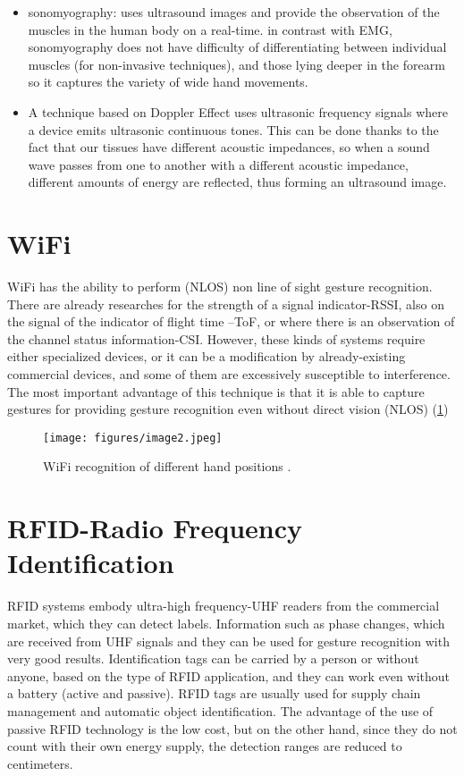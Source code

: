 \documentclass[12pt]{book}
\begin{document}
\begin{itemize}
    \item sonomyography: uses ultrasound images and provide the observation of the muscles in the human body on a real-time. in contrast with EMG, sonomyography does not have difficulty of differentiating between individual muscles (for non-invasive techniques), and those lying deeper in the forearm so it captures the variety of wide hand movements.
    \item A technique based on Doppler Effect uses ultrasonic frequency signals where a device emits ultrasonic continuous tones. This can be done thanks to the fact that our tissues have different acoustic impedances, so when a sound wave passes from one to another with a different acoustic impedance, different amounts of energy are reflected, thus forming an ultrasound image. 
\end{itemize}

\section{WiFi}\label{s:sec7}
WiFi has the ability to perform (NLOS) non line of sight gesture recognition. There are already researches for the strength of a signal indicator-RSSI, also on the signal of the indicator of flight time –ToF, or where there is an observation of the channel status information-CSI. However, these kinds of systems require either specialized devices, or it can be a modification by already-existing commercial devices, and some of them are excessively susceptible to interference. The most important advantage of this technique is that it is able to capture gestures for providing gesture recognition even without direct vision (NLOS) (\ref{fig:fig2})

\begin{figure}[!htbp]
\centering
  \texttt{[image: figures/image2.jpeg]}
  \\
  \caption{WiFi recognition of different hand positions \cite{JES2020} .}
  \label{fig:fig2}
\end{figure}

\section{RFID-Radio Frequency Identification}\label{s:sec8}
RFID systems embody ultra-high frequency-UHF readers from the commercial market, which they can detect labels. Information such as phase changes, which are received from UHF signals and they can be used for gesture recognition with very good results. Identification tags can be carried by a person or without anyone, based on the type of RFID application, and they can work even without a battery (active and passive). RFID tags are usually used for supply chain management and automatic object identification. The advantage of the use of passive RFID technology is the low cost, but on the other hand, since they do not count with their own energy supply, the detection ranges are reduced to centimeters.
\end{document}
